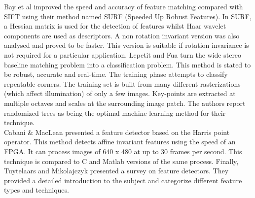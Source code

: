Bay et al \cite{Bay06Surf,Bay08Speeded} improved the speed and accuracy of feature matching compared with SIFT using their method named SURF (Speeded Up Robust Features). In SURF, a Hessian matrix is used for the detection of features whilst Haar wavelet components are used as descriptors. A non rotation invariant version was also analysed and proved to be faster. This version is suitable if rotation invariance is not required for a particular application. Lepetit and Fua \cite{Lepetit06Keypoint} turn the wide stereo baseline matching problem into a classification problem. This method is stated to be robust, accurate and real-time. The training phase attempts to classify repeatable corners. The training set is built from many different rasterizations (which affect illumination) of only a few images. Key-points are extracted at multiple octaves and scales at the surrounding image patch. The authors report randomized trees as being the optimal machine learning method for their technique. \\


Cabani \& MacLean \cite{Cabani07Implementation} presented a feature detector based on the Harris point operator. This method detects affine invariant features using the speed of an FPGA. It can process images of 640 x 480 at up to 30 frames per second. This technique is compared to C and Matlab versions of the same process. Finally, Tuytelaars and Mikolajczyk \cite{Tuytelaars08Local} presented a survey on feature detectors. They provided a detailed introduction to the subject and categorize different feature types and techniques. \\
